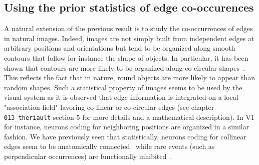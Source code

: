 \documentclass[a4paper, 11pt]{book}
\begin{document}
\subsection{Using the prior statistics of edge co-occurences}
A natural extension of the previous result is to study the co-occurrences of edges in natural images.
Indeed, images are not simply built from independent edges at arbitrary positions and orientations but tend to be organized along smooth contours that follow for instance the shape of objects.
In particular, it has been shown that contours are more likely to be organized along co-circular shapes~\citep{Sigman01}.
This reflects the fact that in nature, round objects are more likely to appear than random shapes.
Such a statistical property of images seems to be used by the visual system as it is observed that edge information is integrated on a local "association field" favoring co-linear or co-circular edges (see chapter \verb+013_theriault+ section 5 for more details and a mathematical description).
In V1 for instance, neurons coding for neighboring positions are organized in a similar fashion. We have previously seen that statistically, neurons coding for collinear edges seem to be anatomically connected~\citep{Bosking97,Hunt11} while rare events (such as perpendicular occurrences) are functionally inhibited~\citep{Hunt11}.
\end{document}
